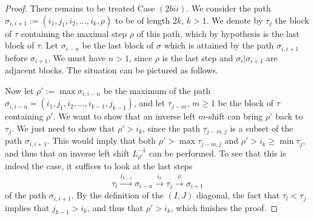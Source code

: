 \documentclass{amsart}
\newcommand{\Guillaume}[1]{\todo[color=magenta!30]{\rm #1 \\ \hfill --- G.}}
\theoremstyle{definition}
\begin{document}
\begin{proof}
There remains to be treated Case $(2bii)$.
We consider the path $\sigma_{i,i+1}:=(i_1,j_1,i_2,...,i_{k},\rho)$ to be of length $2k$, $k>1$. 
We denote by $\tau_j$ the block of $\tau$ containing the maximal step $\rho$ of this path, which by hypothesis is the last block of $\tau$. 
Let $\sigma_{i-n}$ be the last block of $\sigma$ which is attained by the path $\sigma_{i,i+1}$ before $\sigma_{i+1}$. 
We must have $n>1$, since $\rho$ is the last step and $\sigma_i|\sigma_{i+1}$ are adjacent blocks.
The situation can be pictured as follows.
\begin{center}
\end{center}
\Guillaume{make better drawing}
Now let $\rho':=\max\sigma_{i,i-n}$ be the maximum of the path $\sigma_{i,i-n}=(i_1,j_1,i_2,...,i_{k-1},j_{k-1})$, and let $\tau_{j-m}$, $m\geq 1$ be the block of $\tau$ containing $\rho'$.
We want to show that an inverse left $m$-shift can bring $\rho'$ back to $\tau_j$.  
We just need to show that $\rho' > i_k$, since the path $\tau_{j-m,j}$ is a subset of the path $\sigma_{i,i+1}$. 
This would imply that both $\rho' > \max \tau_{j-m,j}$ and $\rho' > i_k \geq \min \tau_j$, and thus that an inverse left shift $L_{\rho'}^{-1}$ can be performed.
To see that this is indeed the case, it suffices to look at the last steps $$\tau_l \overset{j_{k-1}}{\longrightarrow} \sigma_{i-n} \overset{i_{k}}{\longrightarrow} \tau_j \overset{\rho}{\longrightarrow} \sigma_{i+1}$$ of the path $\sigma_{i,i+1}$. 
By the definition of the $(I,J)$ diagonal, the fact that $\tau_l < \tau_j$ implies that $j_{k-1} > i_k$, and thus that $\rho' > i_k$, which finishes the proof. 
\end{proof}
\end{document}
